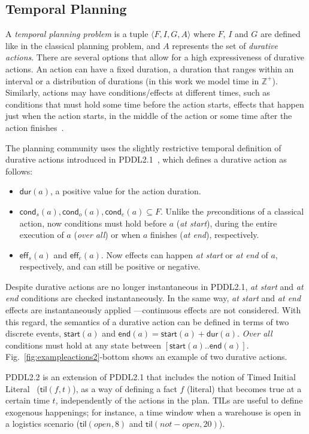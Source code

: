\documentclass[runningheads]{llncs}
\newcommand{\tup}[1]{{\langle #1 \rangle}}
\newcommand{\eff}{\mathsf{eff}}    %
\newcommand{\cond}{\mathsf{cond}}  %
\newcommand{\dur}{\mathsf{dur}}    %
\newcommand{\start}{\mathsf{start}}%
\newcommand{\en}{\mathsf{end}}     %
\newcommand{\til}{\mathsf{til}}    %
\begin{document}
\subsection{Temporal Planning}
\label{sec:temporalplanning}

A {\em temporal planning problem} is a tuple $\tup{F,I,G,A}$ where $F$, $I$ and $G$ are defined like in the classical planning problem, and $A$ represents the set of {\em durative actions}. There are several options that allow for a high expressiveness of durative actions. An action can have a fixed duration, a duration that ranges within an interval or a distribution of durations (in this work we model time in $\mathbb{Z}^+$). Similarly, actions may have conditions/effects at different times, such as conditions that must hold some time before the action starts, effects that happen just when the action starts, in the middle of the action or some time after the action finishes~\cite{garrido2009constraint}.

The planning community uses the slightly restrictive temporal definition of durative actions introduced in PDDL2.1~\cite{fox2003pddl2}, which defines a durative action as follows:
\begin{itemize}
\item $\dur(a)$, a positive value for the action duration.
\item $\cond_s(a), \cond_o(a), \cond_e(a) \subseteq F$. Unlike the \emph{pre}conditions of a classical action, now conditions must hold before $a$ ({\em at start}), during the entire execution of $a$ ({\em over all}) or when $a$ finishes ({\em at end}), respectively.
\item $\eff_s(a)$ and $\eff_e(a)$. Now effects can happen {\em at start} or {\em at end} of $a$, respectively, and can still be positive or negative.
\end{itemize}

Despite durative actions are no longer instantaneous in PDDL2.1, {\em at start} and {\em at end} conditions are checked instantaneously. In the same way, {\em at start} and {\em at end} effects are instantaneously applied ---continuous effects are not considered. With this regard, the semantics of a durative action can be defined in terms of two discrete events, $\start(a)$ and $\en(a)=\start(a)+\dur(a)$.
{\em Over all} conditions must hold at any state between $[\start(a)..\en(a)]$. Fig.~\ref{fig:exampleactions2}-bottom shows an example of two durative actions.

PDDL2.2 is an extension of PDDL2.1 that includes the notion of Timed Initial Literal~\cite{hoffmann2005} ($\til(f,t)$), as a way of defining a fact $f$ (literal) that becomes true at a certain time $t$, independently of the actions in the plan. TILs are useful to define exogenous happenings; for instance, a time window when a warehouse is open in a logistics scenario ($\til(open,8)$ and $\til(not-open,20)$).
\end{document}
